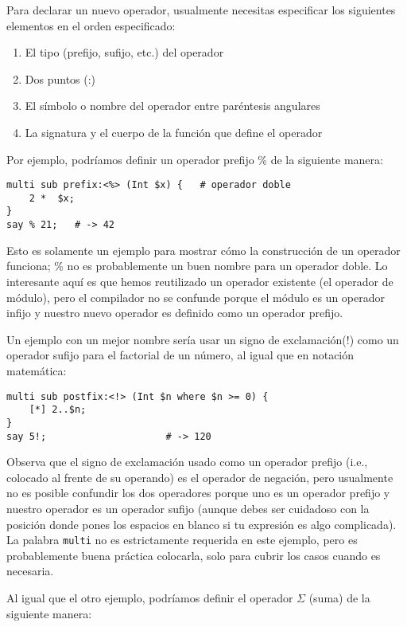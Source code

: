 Para declarar un nuevo operador, usualmente necesitas especificar los siguientes
elementos en el orden especificado:
\begin{enumerate}
\item El tipo (prefijo, sufijo, etc.) del operador
\item Dos puntos (:)
\item El símbolo o nombre del operador entre paréntesis angulares 
\item La signatura y el cuerpo de la función que define el operador
\end{enumerate}

Por ejemplo, podríamos definir un operador prefijo \% de la siguiente 
manera:

\begin{verbatim}
multi sub prefix:<%> (Int $x) {   # operador doble
    2 *  $x;
}
say % 21;   # -> 42
\end{verbatim}

Esto es solamente un ejemplo para mostrar cómo la construcción de un 
operador funciona; \% no es probablemente un buen nombre para un operador
doble. Lo interesante aquí es que hemos reutilizado un operador existente
(el operador de módulo), pero el compilador no se confunde porque el 
módulo es un operador infijo y nuestro nuevo operador es definido como
un operador prefijo.

Un ejemplo con un mejor nombre sería usar un signo de exclamación(!) como
un operador sufijo para el factorial de un número, al igual que en 
notación matemática:

\begin{verbatim}
multi sub postfix:<!> (Int $n where $n >= 0) {
    [*] 2..$n;
}
say 5!;                     # -> 120
\end{verbatim}

Observa que el signo de exclamación usado como un operador prefijo
(i.e., colocado al frente de su operando) es el operador de negación,
pero usualmente no es posible confundir los dos operadores
porque uno es un operador prefijo y nuestro operador es un operador
sufijo (aunque debes ser cuidadoso con la posición donde pones los 
espacios en blanco si tu expresión es algo complicada). La palabra 
{\tt multi} no es estrictamente requerida en este ejemplo, pero es 
probablemente buena práctica colocarla, solo para cubrir los casos
cuando es necesaria.

Al igual que el otro ejemplo, podríamos definir el operador $\Sigma$ (suma) 
de la siguiente manera:

